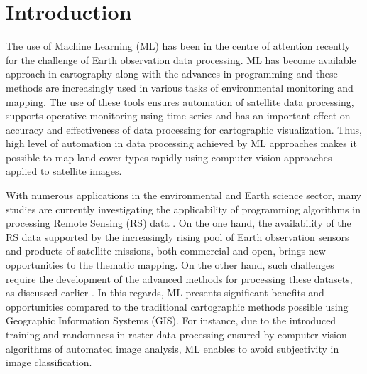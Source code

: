 \documentclass[climate,article,submit,pdftex,moreauthors]{Definitions/mdpi}
\begin{document}
\section{Introduction}

The use of Machine Learning (ML) has been in the centre of attention recently for the challenge of Earth observation data processing. ML has become available approach in cartography along with the advances in programming and these methods are increasingly used in various tasks of environmental monitoring and mapping. The use of these tools ensures automation of satellite data processing, supports operative monitoring using time series and has an important effect on accuracy and effectiveness of data processing for cartographic visualization. Thus, high level of automation in data processing achieved by ML approaches makes it possible to map land cover types rapidly using computer vision approaches applied to satellite images.

With numerous applications in the environmental and Earth science sector, many studies are currently investigating the applicability of programming algorithms in processing Remote Sensing (RS) data \cite{10080513,10334172,Lemenkova202227,9964623,jimaging9050098,9393066}. On the one hand, the availability of the RS data supported by the increasingly rising pool of Earth observation sensors and products of satellite missions, both commercial and open, brings new opportunities to the thematic mapping. On the other hand, such challenges require the development of the advanced methods for processing these datasets, as discussed earlier \cite{JASIEWICZ20111525}. In this regards, ML presents significant benefits and opportunities compared to the traditional cartographic methods possible using Geographic Information Systems (GIS). For instance, due to the introduced training and randomness in raster data processing ensured by computer-vision algorithms of automated image analysis, ML enables to avoid subjectivity in image classification. 
\end{document}

